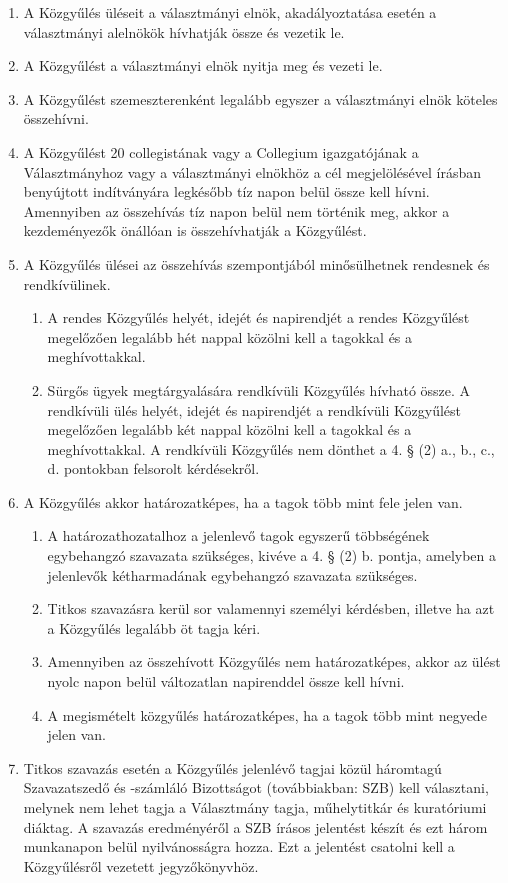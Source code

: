 \documentclass{rulebook}
\begin{document}
\begin{enumerate}
	\item A Közgyűlés üléseit a választmányi elnök, akadályoztatása esetén a választmányi alelnökök hívhatják össze és vezetik le.
	\item A Közgyűlést a választmányi elnök nyitja meg és vezeti le.
	\item A Közgyűlést szemeszterenként legalább egyszer a választmányi elnök köteles összehívni.
	\item A Közgyűlést 20 collegistának vagy a Collegium igazgatójának a Választmányhoz vagy a választmányi elnökhöz a cél megjelölésével írásban benyújtott indítványára legkésőbb tíz napon belül össze kell hívni. Amennyiben az összehívás tíz napon belül nem történik meg, akkor a kezdeményezők önállóan is összehívhatják a Közgyűlést.
	\item A Közgyűlés ülései az összehívás szempontjából minősülhetnek rendesnek és rendkívülinek.
	\begin{enumerate}
		\item A rendes Közgyűlés helyét, idejét és napirendjét a rendes Közgyűlést megelőzően legalább hét nappal közölni kell a tagokkal és a meghívottakkal.
		\item Sürgős ügyek megtárgyalására rendkívüli Közgyűlés hívható össze. A rendkívüli ülés helyét, idejét és napirendjét a rendkívüli Közgyűlést megelőzően legalább két nappal közölni kell a tagokkal és a meghívottakkal. A rendkívüli Közgyűlés nem dönthet a 4. § (2) a., b., c., d. pontokban felsorolt kérdésekről.
	\end{enumerate}
	\item A Közgyűlés akkor határozatképes, ha a tagok több mint fele jelen van.
	\begin{enumerate}
		\item A határozathozatalhoz a jelenlevő tagok egyszerű többségének egybehangzó szavazata szükséges, kivéve a 4. § (2) b. pontja, amelyben a jelenlevők kétharmadának egybehangzó szavazata szükséges.
		\item Titkos szavazásra kerül sor valamennyi személyi kérdésben, illetve ha azt a Közgyűlés legalább öt tagja kéri.
		\item Amennyiben az összehívott Közgyűlés nem határozatképes, akkor az ülést nyolc napon belül változatlan napirenddel össze kell hívni.
		\item A megismételt közgyűlés határozatképes, ha a tagok több mint negyede jelen van.
	\end{enumerate}
	\item Titkos szavazás esetén a Közgyűlés jelenlévő tagjai közül háromtagú Szavazatszedő és -számláló Bizottságot (továbbiakban: SZB) kell választani, melynek nem lehet tagja a Választmány tagja, műhelytitkár és kuratóriumi diáktag. A szavazás eredményéről a SZB írásos jelentést készít és ezt három munkanapon belül nyilvánosságra hozza. Ezt a jelentést csatolni kell a Közgyűlésről vezetett jegyzőkönyvhöz.

\end{enumerate}
\end{document}
